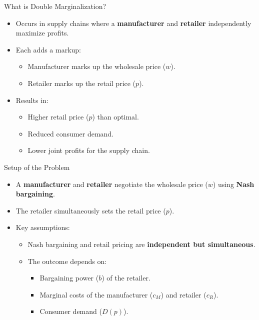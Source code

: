 \documentclass[aspectratio=169]{beamer}  %
\begin{document}
    

\begin{frame}{What is Double Marginalization?}
    \begin{itemize}
        \item Occurs in supply chains where a \textbf{manufacturer} and \textbf{retailer} independently maximize profits.
        \item Each adds a markup:
        \begin{itemize}
            \item Manufacturer marks up the wholesale price (\(w\)).
            \item Retailer marks up the retail price (\(p\)).
        \end{itemize}
        \item Results in:
        \begin{itemize}
            \item Higher retail price (\(p\)) than optimal.
            \item Reduced consumer demand.
            \item Lower joint profits for the supply chain.
        \end{itemize}
    \end{itemize}
\end{frame}

\begin{frame}{Setup of the Problem}
    \begin{itemize}
        \item A \textbf{manufacturer} and \textbf{retailer} negotiate the wholesale price (\(w\)) using \textbf{Nash bargaining}.
        \item The retailer simultaneously sets the retail price (\(p\)).
        \item Key assumptions:
        \begin{itemize}
            \item Nash bargaining and retail pricing are \textbf{independent but simultaneous}.
            \item The outcome depends on:
            \begin{itemize}
                \item Bargaining power (\(b\)) of the retailer.
                \item Marginal costs of the manufacturer (\(c_M\)) and retailer (\(c_R\)).
                \item Consumer demand (\(D(p)\)).
            \end{itemize}
        \end{itemize}
    \end{itemize}
\end{frame}
\end{document}
